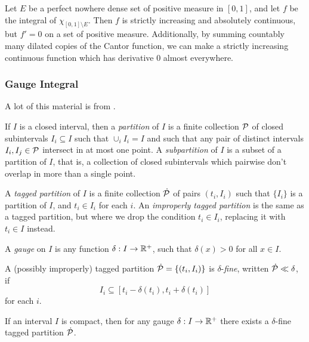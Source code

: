 \begin{ex} Let $E$ be a perfect nowhere dense set of positive measure in $[0,1]$, and let $f$ be the integral of $\chi_{[0,1]\setminus E}$. Then $f$ is strictly increasing and absolutely continuous, but $f' = 0$ on a set of positive measure. Additionally, by summing countably many dilated copies of the Cantor function, we can make a strictly increasing continuous function which has derivative $0$ almost everywhere.
\end{ex}

\subsubsection{Gauge Integral}

A lot of this material is from \cite{modern-integration}.

\begin{defn} If $I$ is a closed interval, then a \emph{partition} of $I$ is a finite collection $\mathcal{P}$ of closed subintervals $I_i \subseteq I$ such that $\cup_i I_i = I$ and such that any pair of distinct intervals $I_i, I_j \in \mathcal{P}$ intersect in at most one point. A \emph{subpartition} of $I$ is a subset of a partition of $I$, that is, a collection of closed subintervals which pairwise don't overlap in more than a single point.

A \emph{tagged partition} of $I$ is a finite collection $\dot{\mathcal{P}}$ of pairs $(t_i, I_i)$ such that $\{I_i\}$ is a partition of $I$, and $t_i \in I_i$ for each $i$. An \emph{improperly tagged partition} is the same as a tagged partition, but where we drop the condition $t_i \in I_i$, replacing it with $t_i \in I$ instead.
\end{defn}

\begin{defn} A \emph{gauge} on $I$ is any function $\delta : I \rightarrow \mathbb{R}^+$, such that $\delta(x) > 0$ for all $x \in I$.

A (possibly improperly) tagged partition $\dot{\mathcal{P}} = \{(t_i,I_i)\}$ is $\delta$-\emph{fine}, written $\dot{\mathcal{P}} \ll \delta$, if
\[
I_i \subseteq [t_i - \delta(t_i), t_i + \delta(t_i)]
\]
for each $i$.
\end{defn}

\begin{lem} If an interval $I$ is compact, then for any gauge $\delta : I \rightarrow \mathbb{R}^+$ there exists a $\delta$-fine tagged partition $\dot{\mathcal{P}}$.
\end{lem}

